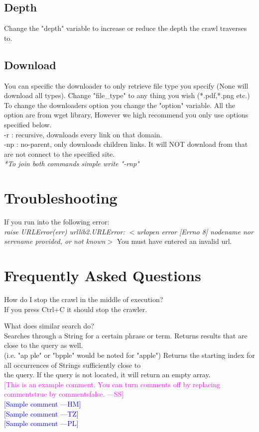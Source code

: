 \documentclass[12pt, titlepage]{article}
\newcommand{\authornote}[3]{\textcolor{#1}{[#3 ---#2]}}
\newcommand{\authornote}[3]{}
\newcommand{\wss}[1]{\authornote{magenta}{SS}{#1}}
\newcommand{\hm}[1]{\authornote{blue}{HM}{#1}} %
\newcommand{\tz}[1]{\authornote{blue}{TZ}{#1}} %
\newcommand{\pl}[1]{\authornote{blue}{PL}{#1}} %
\begin{document}
\subsection{Depth} 
Change the "depth" variable to increase or reduce the depth the crawl traverses to.

\subsection{Download} 
You can specific the downloader to only retrieve file type you specify (None will download all types). Change "file\_type" to any thing you wish (*.pdf,*.png etc.)\\
To change the downloaders option you change the "option" variable. All the option are from wget library, However we high recommend you only use options specified below.\\
-r : recursive, downloads every link on that domain.\\
-np : no-parent, only downloads children links. It will NOT download from that are not connect to the specified site.\\
\textit{*To join both commands simple write "-rnp"}

\pagebreak
\section{Troubleshooting}
If you run into the following error:\\
\textit{ raise URLError(err)
urllib2.URLError: ${<}$urlopen error [Errno 8] nodename nor servname provided, or not known${>}$}
You must have entered an invalid url.

\pagebreak
\section{Frequently Asked Questions}
How do I stop the crawl in the middle of execution?\\
If you press Ctrl+C it should stop the crawler.

What does similar search do?\\
 Searches through a String for a certain phrase or term. Returns results that are close to the query as well.\\
        (i.e. "ap ple" or "bpple" would be noted for "apple") Returns the starting index for all occurrences of Strings sufficiently close to\\
        the query. If the query is not located, it will return an empty array.\\


\noindent \wss{This is an example comment.  You can turn comments off by replacing
  commentstrue by commentsfalse.}\\
\hm{Sample comment}\\
\tz{Sample comment}\\
\pl{Sample comment}
\end{document}
